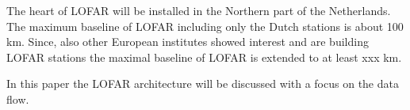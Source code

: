 \documentclass[journal]{IEEEtran}
\begin{document}
The heart of LOFAR will be installed in the Northern part of the Netherlands. The maximum baseline of LOFAR including only the Dutch stations is about 100 km. Since, also other European institutes showed interest and are building LOFAR stations the maximal baseline of LOFAR is extended to at least xxx km.  

In this paper the LOFAR architecture will be discussed with a focus on the data flow.

 





%
%

\end{document}
